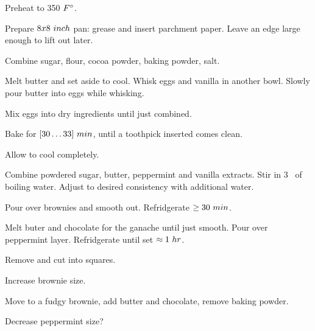 \begin{preparation}
\item Preheat to 350 $\Fahrenheit$.

\item Prepare $8x8~\inch$ pan: grease and insert parchment paper.
	Leave an edge large enough to lift out later.

\item Combine sugar, flour, cocoa powder, baking powder, salt.

\item Melt butter and set aside to cool.
	Whisk eggs and vanilla in another bowl.
	Slowly pour butter into eggs while whisking.

\item Mix eggs into dry ingredients until just combined.

\item Bake for $[30 \ldots 33]~\minute$, until a toothpick inserted comes clean.

\item Allow to cool completely.

\item Combine powdered sugar, butter, peppermint and vanilla extracts.
	Stir in 3 \Tablespoon~of boiling water.
	Adjust to desired consistency with additional water.

\item Pour over brownies and smooth out.
	Refridgerate $\ge 30~\minute$.

\item Melt buter and chocolate for the ganache until just smooth.
	Pour over peppermint layer.
	Refridgerate until set $\approx 1~\hour$.

\item Remove and cut into squares.
\end{preparation}


\begin{experiments}
\item Increase brownie size.
\item Move to a fudgy brownie, add butter and chocolate, remove baking powder.
\item Decrease peppermint size?
\end{experiments}


\recipeend
